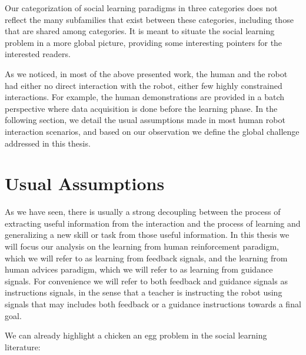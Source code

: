 Our categorization of social learning paradigms  in three categories does not reflect the many subfamilies that exist between these categories, including those that are shared among categories. It is meant to situate the social learning problem in a more global picture, providing some interesting pointers for the interested readers. 

As we noticed, in most of the above presented work, the human and the robot had either no direct interaction with the robot, either few  highly constrained interactions. For example, the human demonstrations are provided in a batch perspective where data acquisition is done
before the learning phase. In the following section, we detail the usual assumptions made in most human robot interaction scenarios, and based on our observation we define the global challenge addressed in this thesis.

\section{Usual Assumptions}

As we have seen, there is usually a strong decoupling between the process of extracting useful information from the interaction and the process of learning and generalizing a new skill or task from those useful information. In this thesis we will focus our analysis on the learning from human reinforcement paradigm, which we will refer to as learning from feedback signals, and the learning from human advices paradigm, which we will refer to as learning from guidance signals. For convenience we will refer to both feedback and guidance signals as instructions signals, in the sense that a teacher is instructing the robot using signals that may includes both feedback or a guidance instructions towards a final goal.

We can already highlight a chicken an egg problem in the social learning literature:

